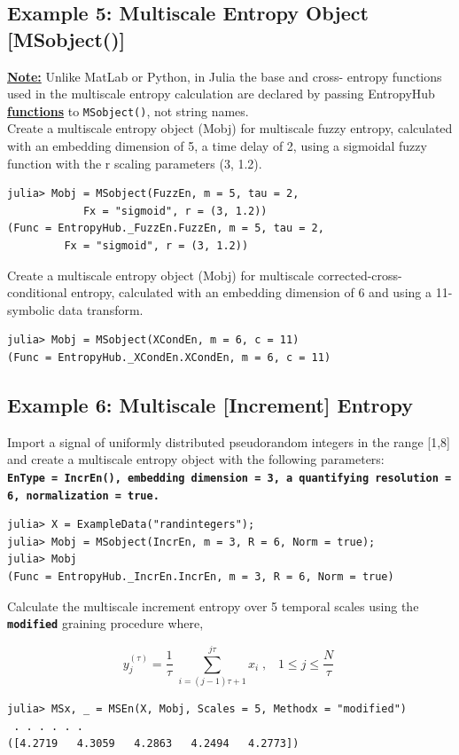 \documentclass[12pt, a4paper, titlepage, openany]{book}
\begin{document}
\newpage
\subsection{\normalsize Example 5: \hspace{15mm} Multiscale Entropy Object [MSobject()]}\label{ExMobjJ}

\noindent\textbf{\ul{Note:}} Unlike MatLab or Python,  in Julia the base and cross- entropy functions used in the multiscale entropy calculation are declared by passing EntropyHub \ul{\textbf{functions}} to \texttt{MSobject()}, not string names.\\

\noindent Create a multiscale entropy object (Mobj) for multiscale fuzzy entropy, calculated with an embedding dimension of 5, a time delay of 2, using a sigmoidal fuzzy function with the r scaling parameters (3, 1.2).
\begin{verbatim}
julia> Mobj = MSobject(FuzzEn, m = 5, tau = 2, 
			Fx = "sigmoid", r = (3, 1.2))
(Func = EntropyHub._FuzzEn.FuzzEn, m = 5, tau = 2,
		 Fx = "sigmoid", r = (3, 1.2))
\end{verbatim}
Create a multiscale entropy object (Mobj) for multiscale corrected-cross-conditional entropy, calculated with an embedding dimension of 6 and using a 11-symbolic data transform.
\begin{verbatim}
julia> Mobj = MSobject(XCondEn, m = 6, c = 11)
(Func = EntropyHub._XCondEn.XCondEn, m = 6, c = 11)
\end{verbatim}


\newpage
\subsection{\normalsize Example 6: \hspace{15mm} Multiscale [Increment] Entropy}
\noindent Import a signal of uniformly distributed pseudorandom integers in the range [1,8] and create a multiscale entropy object with the following parameters:\\
\textbf{\texttt{EnType =  IncrEn(), embedding dimension = 3, a quantifying resolution = 6, normalization = true.}}
\begin{verbatim}
julia> X = ExampleData("randintegers");
julia> Mobj = MSobject(IncrEn, m = 3, R = 6, Norm = true);
julia> Mobj
(Func = EntropyHub._IncrEn.IncrEn, m = 3, R = 6, Norm = true)
\end{verbatim}    
Calculate the multiscale increment entropy over 5 temporal scales using the \texttt{\textbf{modified}} graining procedure where,
\begin{par}
$$y_j^{\left(\tau \right)} =\frac{1}{\tau }\;\sum_{i=\left(j-1\right)\tau +1}^{j\tau } x_i \;,\;\;\;1\le j\le \frac{N}{\tau }\;$$
\end{par}
\begin{verbatim}
julia> MSx, _ = MSEn(X, Mobj, Scales = 5, Methodx = "modified")
 . . . . . .
([4.2719   4.3059   4.2863   4.2494   4.2773])
\end{verbatim}
\end{document}
